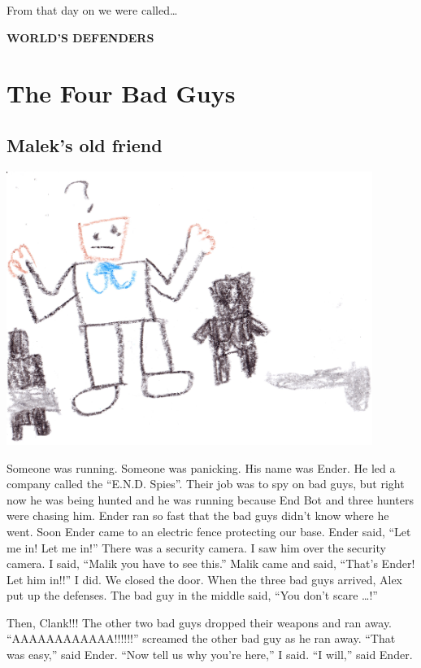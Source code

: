 \documentclass[12pt,twoside]{krantz}
\begin{document}
From that day on we were called\ldots{}

\textbf{WORLD'S DEFENDERS}

\hypertarget{the-four-bad-guys}{%
\chapter{The Four Bad Guys}\label{the-four-bad-guys}}

\hypertarget{maleks-old-friend}{%
\section{Malek's old friend}\label{maleks-old-friend}}

\includegraphics[width=4.6875in,height=\textheight]{img/four-bad-guys/scared.jpg}

Someone was running. Someone was panicking. His name was Ender. He led a
company called the ``E.N.D. Spies''. Their job was to spy on bad guys,
but right now he was being hunted and he was running because End Bot and
three hunters were chasing him. Ender ran so fast that the bad guys
didn't know where he went. Soon Ender came to an electric fence
protecting our base. Ender said, ``Let me in! Let me in!'' There was a
security camera. I saw him over the security camera. I said, ``Malik you
have to see this.'' Malik came and said, ``That's Ender! Let him in!!''
I did. We closed the door. When the three bad guys arrived, Alex put up
the defenses. The bad guy in the middle said, ``You don't scare
\ldots{}!''

Then, Clank!!! The other two bad guys dropped their weapons and ran
away. ``AAAAAAAAAAAA!!!!!!'' screamed the other bad guy as he ran away.
``That was easy,'' said Ender. ``Now tell us why you're here,'' I said.
``I will,'' said Ender.
\end{document}
